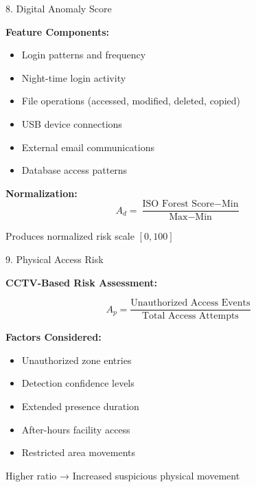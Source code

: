 \documentclass[aspectratio=169]{beamer}
\begin{document}
\begin{frame}{8. Digital Anomaly Score}

\textbf{Feature Components:}
\begin{itemize}
    \item Login patterns and frequency
    \item Night-time login activity
    \item File operations (accessed, modified, deleted, copied)
    \item USB device connections
    \item External email communications
    \item Database access patterns
\end{itemize}

\vspace{0.3cm}

\textbf{Normalization:}
\[
A_d = \frac{\text{ISO Forest Score} - \text{Min}}{\text{Max} - \text{Min}}
\]

Produces normalized risk scale $[0, 100]$

\end{frame}

\begin{frame}{9. Physical Access Risk}

\textbf{CCTV-Based Risk Assessment:}

\[
A_p = \frac{\text{Unauthorized Access Events}}{\text{Total Access Attempts}}
\]

\vspace{0.3cm}

\textbf{Factors Considered:}
\begin{itemize}
    \item Unauthorized zone entries
    \item Detection confidence levels
    \item Extended presence duration
    \item After-hours facility access
    \item Restricted area movements
\end{itemize}

\vspace{0.3cm}

Higher ratio → Increased suspicious physical movement

\end{frame}
\end{document}
